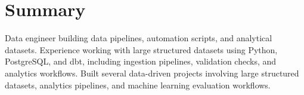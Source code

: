 
\section{Summary}
Data engineer building data pipelines, automation scripts, and analytical datasets.
Experience working with large structured datasets using Python, PostgreSQL, and dbt,
including ingestion pipelines, validation checks, and analytics workflows.
Built several data-driven projects involving large structured datasets, analytics pipelines, and machine learning evaluation workflows.

